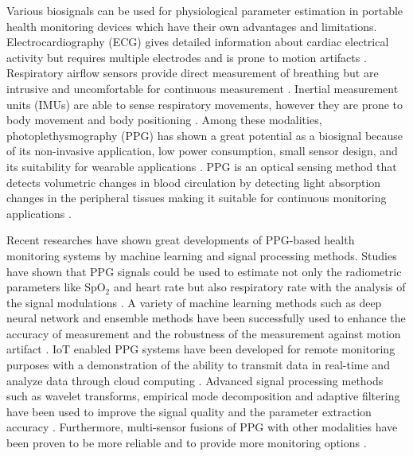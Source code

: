 \documentclass{ieeeaccess}
\begin{document}
Various biosignals can be used for physiological parameter estimation in portable health monitoring devices which have their own advantages and limitations. Electrocardiography (ECG) gives detailed information about cardiac electrical activity but requires multiple electrodes and is prone to motion artifacts \cite{b6}. Respiratory airflow sensors provide direct measurement of breathing but are intrusive and uncomfortable for continuous measurement \cite{b7}. Inertial measurement units (IMUs) are able to sense respiratory movements, however they are prone to body movement and body positioning \cite{b8}. Among these modalities, photoplethysmography (PPG) has shown a great potential as a biosignal because of its non-invasive application, low power consumption, small sensor design, and its suitability for wearable applications \cite{b9}. PPG is an optical sensing method that detects volumetric changes in blood circulation by detecting light absorption changes in the peripheral tissues making it suitable for continuous monitoring applications \cite{b10}.

Recent researches have shown great developments of PPG-based health monitoring systems by machine learning and signal processing methods. Studies have shown that PPG signals could be used to estimate not only the radiometric parameters like SpO$_2$ and heart rate but also respiratory rate with the analysis of the signal modulations \cite{b11,b12}. A variety of machine learning methods such as deep neural network and ensemble methods have been successfully used to enhance the accuracy of measurement and the robustness of the measurement against motion artifact \cite{b13,b14}. IoT enabled PPG systems have been developed for remote monitoring purposes with a demonstration of the ability to transmit data in real-time and analyze data through cloud computing \cite{b15,b16}. Advanced signal processing methods such as wavelet transforms, empirical mode decomposition and adaptive filtering have been used to improve the signal quality and the parameter extraction accuracy \cite{b17,b18}. Furthermore, multi-sensor fusions of PPG with other modalities have been proven to be more reliable and to provide more monitoring options \cite{b19,b20}.
\end{document}

